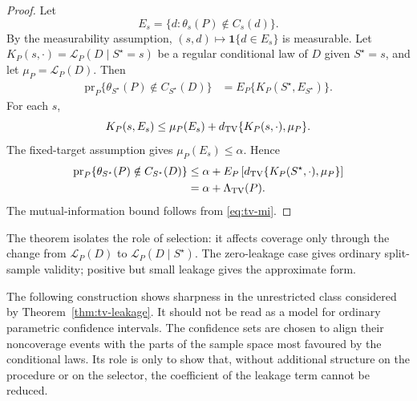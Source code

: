 \documentclass[11pt]{article}
\newcommand{\ind}{\mathbf 1}
\begin{document}
\begin{proof}
	Let
	\[
	E_s=\{d:\theta_s(P)\notin C_s(d)\}.
	\]
	By the measurability assumption, \((s,d)\mapsto\ind\{d\in E_s\}\) is measurable. Let \(K_P(s,\cdot)=\mathcal L_P(D\mid S^\star=s)\) be a regular conditional law	of \(D\) given \(S^\star=s\), and let \(\mu_P=\mathcal L_P(D)\). Then
	\[
	\begin{aligned}
		\mathrm{pr}_P\{\theta_{S^\star}(P)\notin C_{S^\star}(D)\}
		&=
		E_P\{K_P(S^\star,E_{S^\star})\}.
	\end{aligned}
	\]
	For each \(s\),
	\[
	K_P(s,E_s)
	\leq
	\mu_P(E_s)+d_{\rm TV}\{K_P(s,\cdot),\mu_P\}.
	\]
	The fixed-target assumption gives \(\mu_P(E_s)\leq\alpha\). Hence
	\[
	\begin{aligned}
		\mathrm{pr}_P\{\theta_{S^\star}(P)\notin C_{S^\star}(D)\}
		&\leq
		\alpha+
		E_P\left[
		d_{\rm TV}\{K_P(S^\star,\cdot),\mu_P\}
		\right]  \\
		&=
		\alpha+\Lambda_{\rm TV}(P).
	\end{aligned}
	\]
	The mutual-information bound follows from \eqref{eq:tv-mi}.
\end{proof}

The theorem isolates the role of selection: it affects coverage only through the change from \(\mathcal L_P(D)\) to \(\mathcal L_P(D\mid S^\star)\). The zero-leakage case gives ordinary split-sample validity; positive but small leakage gives the approximate form.

The following construction shows sharpness in the unrestricted class considered by Theorem~\ref{thm:tv-leakage}. It should not be read as a model for ordinary parametric confidence intervals. The confidence sets are chosen to align their noncoverage events with the parts of the sample space most favoured by the conditional laws. Its role is only to show that, without additional structure on the procedure or on the selector, the coefficient of the leakage term cannot be reduced. 
\end{document}
